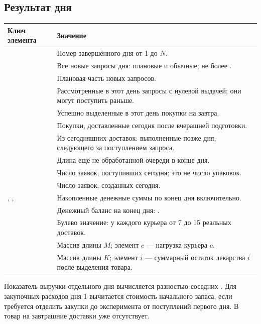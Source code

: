\subsection{Результат дня}
{\small
\begin{longtable}{@{}L{0.37\textwidth}L{0.56\textwidth}@{}}
\toprule
Ключ элемента  & Значение \\
\midrule
\endhead
{} & Номер завершённого дня от 1 до $N$. \\
 & Все новые запросы дня: плановые и обычные;
не более . \\
 & Плановая часть новых запросов. \\
 & Рассмотренные в этот день запросы с нулевой выдачей;
они могут поступить раньше. \\
 & Успешно выделенные в этот день покупки на завтра. \\
 & Покупки, доставленные сегодня после вчерашней подготовки. \\
 & Из сегодняшних доставок: выполненные позже дня,
следующего за поступлением запроса. \\
 & Длина ещё не обработанной очереди в конце дня. \\
 & Число заявок, поступивших сегодня; это не число упаковок. \\
 & Число заявок, созданных сегодня. \\
, , 
& Накопленные денежные суммы по конец дня включительно. \\
 & Денежный баланс на конец дня:
. \\
 & Булево значение: у каждого курьера
от 7 до 15 реальных доставок. \\
 & Массив длины $M$; элемент $c$ --- нагрузка курьера $c$. \\
 & Массив длины $K$; элемент $i$ --- суммарный
остаток лекарства $i$ после выделения товара. \\
\bottomrule
\end{longtable}
}

Показатель выручки отдельного дня вычисляется разностью соседних
. Для закупочных расходов дня 1 вычитается стоимость начального
запаса, если требуется отделить закупки до эксперимента от поступлений первого
дня. В  товар на завтрашние доставки уже отсутствует.

